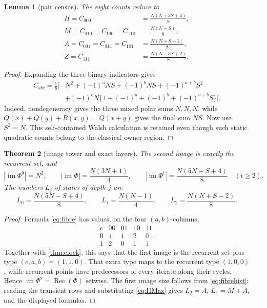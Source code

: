 \documentclass[10pt,a4paper]{amsart}
\newtheorem{theorem}{Theorem}[section]
\newtheorem{lemma}[theorem]{Lemma}
\theoremstyle{definition}
\theoremstyle{remark}
\numberwithin{equation}{section}
\newcommand{\Rec}{\operatorname{Rec}}
\newcommand{\im}{\operatorname{im}}
\begin{document}
\begin{lemma}[pair census]\label{lem:pairs}
The eight counts reduce to
\begin{equation}
\begin{aligned}
 H=C_{000}&=\frac{N(N+3S+4)}8,\\
 M=C_{010}=C_{100}=C_{110}&=\frac{N(N-S)}8,\\
 A=C_{001}=C_{011}=C_{101}&=\frac{N(N+S-2)}8,\\
 Z=C_{111}&=\frac{N(N-3S+2)}8.
\end{aligned}
\label{eq:HMaz}
\end{equation}
\end{lemma}

\begin{proof}
Expanding the three binary indicators gives
\begin{equation}
\begin{aligned}
 C_{abc}=\frac18[&N^2+(-1)^aNS+(-1)^bNS+(-1)^{a+b}S^2\\
 &+(-1)^cN\{1+(-1)^a+(-1)^b+(-1)^{a+b}S\}].
\end{aligned}
\label{eq:walsh}
\end{equation}
Indeed, nondegeneracy gives the three mixed polar sums \(N,N,N\), while
\(Q(x)+Q(y)+B(x,y)=Q(x+y)\) gives the final sum \(NS\).  Now use \(S^2=N\).
This self-contained Walsh calculation is retained even though such static
quadratic counts belong to the classical owner region.
\end{proof}

\begin{theorem}[image tower and exact layers]\label{thm:layers}
The second image is exactly the recurrent set, and
\begin{equation}
 |\im\Phi^0|=N^2,\qquad
 |\im\Phi|=\frac{N(3N+1)}4,\qquad
 |\im\Phi^t|=\frac{N(5N-S+4)}8\quad(t\ge2).              \label{eq:images}
\end{equation}
The numbers \(L_j\) of states of depth \(j\) are
\begin{equation}
 L_0=\frac{N(5N-S+4)}8,\qquad
 L_1=\frac{N(N-1)}4,\qquad
 L_2=\frac{N(N+S-2)}8.                                  \label{eq:layers}
\end{equation}
\end{theorem}

\begin{proof}
Formula \eqref{eq:fibre} has values, on the four \((a,b)\)-columns,
\[
\begin{array}{c|cccc}
c&00&01&10&11\\\hline
0&1&1&2&0\\
1&2&0&1&1
\end{array}.
\]
Together with \cref{thm:clock}, this says that the first image is the
recurrent set plus type \((c,a,b)=(1,1,0)\).  That extra type maps to the
recurrent type \((1,0,0)\), while recurrent points have predecessors of every
iterate along their cycles.  Hence \(\im\Phi^2=\Rec(\Phi)\) setwise.
The first image size follows from \eqref{eq:fibrehist}; reading the transient
rows and substituting \eqref{eq:HMaz} gives
\(L_2=A\), \(L_1=M+A\), and the displayed formulas.
\end{proof}
\end{document}

